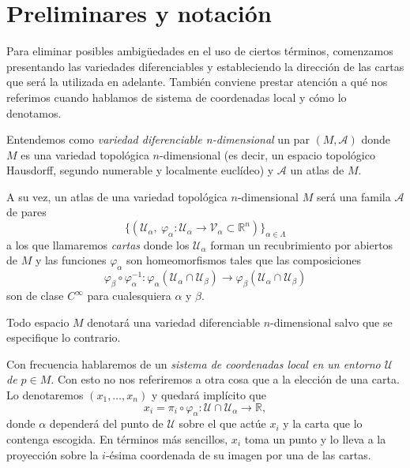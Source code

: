 \section{Preliminares y notación}

Para eliminar posibles ambigüedades en el uso de ciertos términos, comenzamos presentando las variedades diferenciables y estableciendo la dirección de las cartas que será la utilizada en adelante. También conviene prestar atención a qué nos referimos cuando hablamos de sistema de coordenadas local y cómo lo denotamos.

Entendemos como \textit{variedad diferenciable n-dimensional} un par $(M,\mathcal{A})$ donde $M$ es una variedad topológica $n$-dimensional (es decir, un espacio topológico Hausdorff, segundo numerable y localmente euclídeo) y $\mathcal{A}$ un atlas de $M$. 

A su vez, un atlas de una variedad topológica $n$-dimensional $M$ será una famila $\mathcal{A}$ de pares
\begin{equation*}
    \{(\mathcal{U}_{\alpha}, ~\varphi_{\alpha}:\mathcal{U}_{\alpha}\to \mathcal{V}_{\alpha}\subset\mathbb{R}^n)\}_{\alpha\in\Lambda}
\end{equation*}
a los que llamaremos \textit{cartas} donde los $\mathcal{U}_{\alpha}$ forman un recubrimiento por abiertos de $M$ y las funciones $\varphi_{\alpha}$ son homeomorfismos tales que las composiciones 
\begin{equation*}
    \varphi_\beta \circ \varphi_\alpha^{-1} : \varphi_\alpha (\mathcal{U}_\alpha \cap \mathcal{U}_\beta)\to \varphi_\beta (\mathcal{U}_\alpha \cap \mathcal{U}_\beta)
\end{equation*}
son de clase $C^\infty$ para cualesquiera $\alpha$ y $\beta$.

Todo espacio $M$ denotará una variedad diferenciable $n$-dimensional salvo que se especifique lo contrario.

\bigskip

Con frecuencia hablaremos de un \textit{sistema de coordenadas local en un entorno $\mathcal{U}$ de $p\in M$}. Con esto no nos referiremos a otra cosa que a la elección de una carta. Lo denotaremos $(x_{1}, \dots ,x_{n})$ y quedará implícito que 
\begin{equation*}
    x_i = \pi_i \circ \varphi_{\alpha} : \mathcal{U}\cap\mathcal{U}_{\alpha} \to \mathbb{R},
\end{equation*}
donde $\alpha$ dependerá del punto de $\mathcal{U}$ sobre el que actúe $x_i$ y la carta que lo contenga escogida. En términos más sencillos, $x_i$ toma un punto y lo lleva a la proyección sobre la $i$-ésima coordenada de su imagen por una de las cartas.

